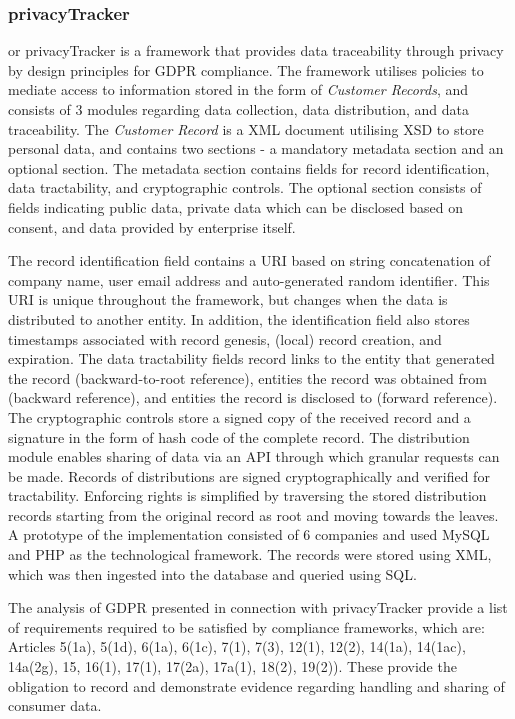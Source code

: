 \subsubsection{privacyTracker}
or privacyTracker \cite{gjermundrod_privacytracker_2016} is a framework that provides data traceability through privacy by design principles for GDPR compliance. The framework utilises policies to mediate access to information stored in the form of \textit{Customer Records}, and consists of 3 modules regarding data collection, data distribution, and data traceability. The \textit{Customer Record} is a XML document utilising XSD to store personal data, and contains two sections - a mandatory metadata section and an optional section. The metadata section contains fields for record identification, data tractability, and cryptographic controls. The optional section consists of fields indicating public data, private data which can be disclosed based on consent, and data provided by enterprise itself.

The record identification field contains a URI based on string concatenation of company name, user email address and auto-generated random identifier. This URI is unique throughout the framework, but changes when the data is distributed to another entity. In addition, the identification field also stores timestamps associated with record genesis, (local) record creation, and expiration. The data tractability fields record links to the entity that generated the record (backward-to-root reference), entities the record was obtained from (backward reference), and entities the record is disclosed to (forward reference). The cryptographic controls store a signed copy of the received record and a signature in the form of hash code of the complete record.
The distribution module enables sharing of data via an API through which granular requests can be made. Records of distributions are signed cryptographically and verified for tractability.
Enforcing rights is simplified by traversing the stored distribution records starting from the original record as root and moving towards the leaves.
A prototype of the implementation consisted of 6 companies and used MySQL and PHP as the technological framework. The records were stored using XML, which was then ingested into the database and queried using SQL.

The analysis of GDPR presented in connection with privacyTracker provide a list of requirements required to be satisfied by compliance frameworks, which are: Articles 5(1a), 5(1d), 6(1a), 6(1c), 7(1), 7(3), 12(1), 12(2), 14(1a), 14(1ac), 14a(2g), 15, 16(1), 17(1), 17(2a), 17a(1), 18(2), 19(2)). These provide the obligation to record and demonstrate evidence regarding handling and sharing of consumer data. 

